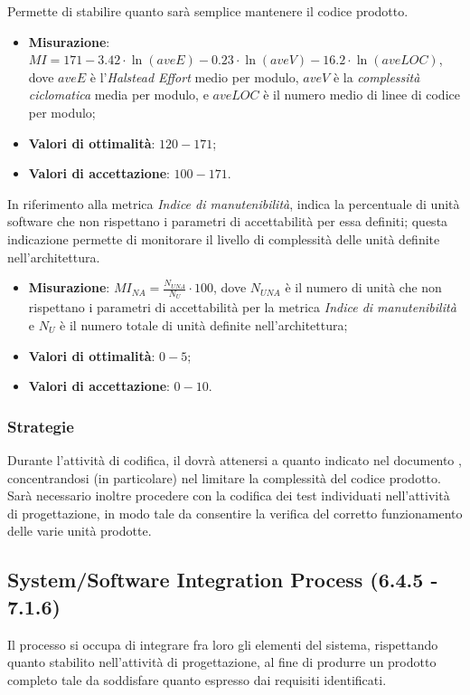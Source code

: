 \label{indMan}
Permette di stabilire quanto sarà semplice mantenere il codice prodotto.
\begin{itemize}
\item \textbf{Misurazione}: $MI = 171 - 3.42 \cdot \ln(aveE) - 0.23 \cdot \ln(aveV) - 16.2 \cdot \ln(aveLOC)$, dove $aveE$ è l'\textit{Halstead Effort} medio per modulo, $aveV$ è la \textit{complessità ciclomatica} media per modulo, e $aveLOC$ è il numero medio di linee di codice per modulo;
\item \textbf{Valori di ottimalità}: $120 - 171$;
\item \textbf{Valori di accettazione}: $100 - 171$.
\end{itemize}
\label{indManNA}
In riferimento alla metrica \textit{Indice di manutenibilità}, indica la percentuale di unità software che non rispettano i parametri di accettabilità per essa definiti; questa indicazione permette di monitorare il livello di complessità delle unità definite nell'architettura.
\begin{itemize}
\item \textbf{Misurazione}: $MI_{NA}=\frac{N_{UNA}}{N_{U}} \cdot 100$, dove $N_{UNA}$ è il numero di unità che non rispettano i parametri di accettabilità per la metrica \textit{Indice di manutenibilità} e $N_{U}$ è il numero totale di unità definite nell'architettura;
\item \textbf{Valori di ottimalità}: $0 - 5$;
\item \textbf{Valori di accettazione}: $0 - 10$.
\end{itemize}
\subsubsection{Strategie}
Durante l'attività di codifica, il \rp dovrà attenersi a quanto indicato nel documento \DP, concentrandosi (in particolare) nel limitare la complessità del codice prodotto.\\
Sarà necessario inoltre procedere con la codifica dei test individuati nell'attività di progettazione, in modo tale da consentire la verifica del corretto funzionamento delle varie unità prodotte.
\subsection{System/Software Integration Process (6.4.5 - 7.1.6)}
\label{sySoIntegration}
Il processo si occupa di integrare fra loro gli elementi del sistema, rispettando quanto stabilito nell'attività di progettazione, al fine di produrre un prodotto completo tale da soddisfare quanto espresso dai requisiti identificati.
